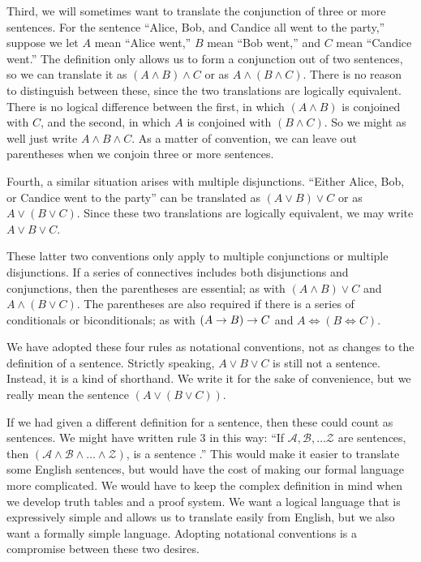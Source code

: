{Third, we will sometimes want to translate the conjunction of three or more sentences. For the sentence ``Alice, Bob, and Candice all went to the party,'' suppose we let $A$ mean ``Alice went,'' $B$ mean ``Bob went,'' and $C$ mean ``Candice went.'' The definition only allows us to form a conjunction out of two sentences, so we can translate it as $(A \land B) \land C$ or as $A \land (B \land C)$. There is no reason to distinguish between these, since the two translations are logically equivalent. There is no logical difference between the first, in which $(A \land B)$ is conjoined with $C$, and the second, in which $A$ is conjoined with $(B \land C)$.  So we might as well just write $A \land B \land C$. As a matter of convention, we can leave out parentheses when we conjoin three or more sentences.

Fourth, a similar situation arises with multiple disjunctions. ``Either Alice, Bob, or Candice went to the party'' can be translated as $(A \lor B) \lor C$ or as $A \lor (B \lor C)$. Since these two translations are logically equivalent, we may write $A \lor B \lor C$.

These latter two conventions only apply to multiple conjunctions or multiple  disjunctions. If a series of connectives includes both disjunctions and conjunctions, then the parentheses are essential; as with $(A \land B) \lor C$ and $A \land (B \lor C)$. The parentheses are also required if there is a series of conditionals or biconditionals; as with $(A \mathrel{\rightarrow} B) \mathrel{\rightarrow} C$ and $A \iff (B \iff C)$.

We have adopted these four rules as notational conventions, not as changes to the definition of a sentence. Strictly speaking, $A \lor B \lor C$ is still not a sentence. Instead, it is a kind of shorthand. We write it for the sake of convenience, but we really mean the sentence $(A \lor (B \lor C))$.

If we had given a different definition for a sentence, then these could count as sentences. We might have written rule 3 in this way: ``If $\mathcal{A}, \mathcal{B}, \ldots \mathcal{Z}$ are sentences, then $(\mathcal{A}\land\mathcal{B}\land\ldots\land\mathcal{Z})$, is a sentence .'' This would make it easier to translate some English sentences, but would have the cost of making our formal language more complicated. We would have to keep the complex definition in mind when we develop truth tables and a proof system. We want a logical language that is expressively simple and allows us to translate easily from English, but we also want a formally simple language. Adopting notational conventions is a compromise between these two desires.


}
